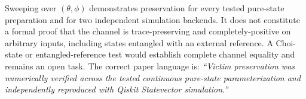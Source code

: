 \begin{cautionbox}
Sweeping over $(\theta,\phi)$ demonstrates preservation for every tested
pure-state preparation and for two independent simulation backends. It does not
constitute a formal proof that the channel is trace-preserving and
completely-positive on arbitrary inputs, including states entangled with an
external reference. A Choi-state or entangled-reference test would establish
complete channel equality and remains an open task.
The correct paper language is: \emph{``Victim preservation was numerically
verified across the tested continuous pure-state parameterization and
independently reproduced with Qiskit Statevector simulation.''}
\end{cautionbox}
